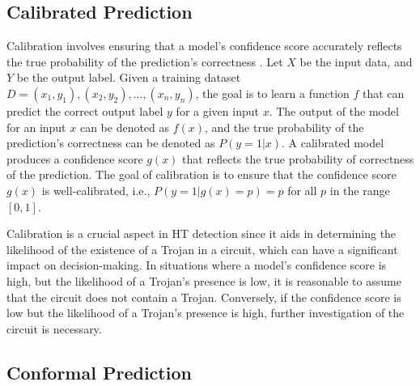 \documentclass[9pt,conference]{IEEEtran}
\begin{document}
\subsection{Calibrated Prediction}
\label{sec:Calibration}
Calibration involves ensuring that a model's confidence score accurately reflects the true probability of the prediction's correctness \cite{ovadia2019can}. Let $X$ be the input data, and $Y$ be the output label. Given a training dataset $D = {(x_1, y_1), (x_2, y_2),..., (x_n, y_n)}$, the goal is to learn a function $f$ that can predict the correct output label $y$ for a given input $x$. The output of the model for an input $x$ can be denoted as $f(x)$, and the true probability of the prediction's correctness can be denoted as $P(y=1|x)$. A calibrated model produces a confidence score $g(x)$ that reflects the true probability of correctness of the prediction. The goal of calibration is to ensure that the confidence score $g(x)$ is well-calibrated, i.e., $P(y=1|g(x)=p) = p$ for all $p$ in the range $[0, 1]$.

Calibration is a crucial aspect in HT detection since it aids in determining the likelihood of the existence of a Trojan in a circuit, which can have a significant impact on decision-making. In situations where a model's confidence score is high, but the likelihood of a Trojan's presence is low, it is reasonable to assume that the circuit does not contain a Trojan. Conversely, if the confidence score is low but the likelihood of a Trojan's presence is high, further investigation of the circuit is necessary.

\subsection{Conformal Prediction}
\label{sec:CP}
\end{document}
